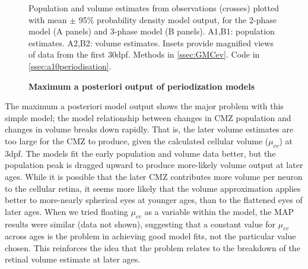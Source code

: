 \documentclass{ut-thesis}
\begin{document}
\begin{NoHyper}
\begin{figure}[!h]
    \caption{{\bf Maximum a posteriori output of periodization models}}
    \label{phaseMAPout}
    Population and volume estimates from observations (crosses) plotted with mean $\pm$ 95\% probability density model output, for the 2-phase model (A panels) and 3-phase model (B panels). A1,B1: population estimates. A2,B2: volume estimates. Insets provide magnified views of data from the first 30dpf.
    Methods in \autoref{ssec:GMCev}.
    Code in \autoref{ssec:a10periodisation}.
\end{figure}

The maximum a posteriori model output shows the major problem with this simple model; the model relationship between changes in CMZ population and changes in volume breaks down rapidly. That is, the later volume estimates are too large for the CMZ to produce, given the calculated cellular volume ($\mu_{cv}$) at 3dpf. The models fit the early population and volume data better, but the population peak is dragged upward to produce more-likely volume output at later ages. While it is possible that the later CMZ contributes more volume per neuron to the cellular retina, it seems more likely that the volume approximation applies better to more-nearly spherical eyes at younger ages, than to the flattened eyes of later ages. When we tried floating $\mu_{cv}$ as a variable within the model, the MAP results were similar (data not shown), suggesting that a constant value for $\mu_{cv}$ across ages is the problem in achieving good model fits, not the particular value chosen. This reinforces the idea that the problem relates to the breakdown of the retinal volume estimate at later ages.


\end{NoHyper}
\end{document}
